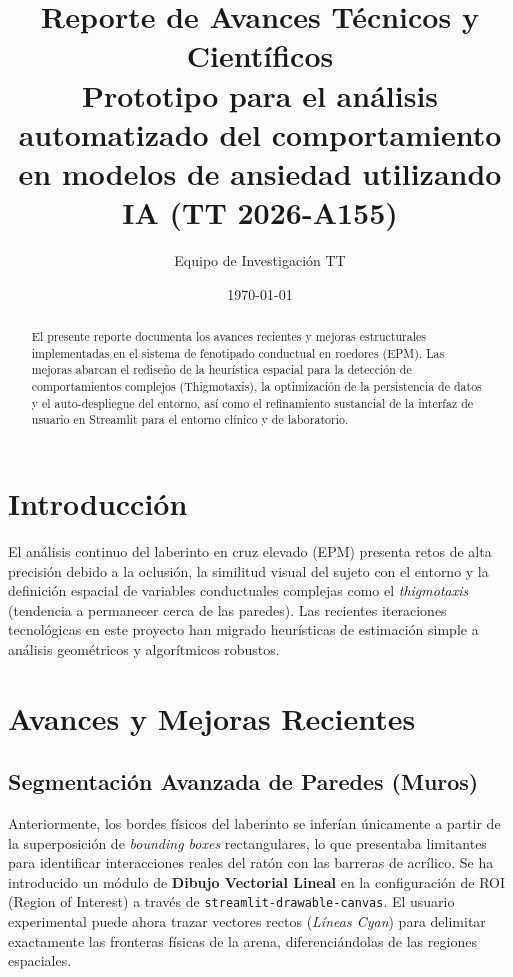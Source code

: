 \documentclass[12pt,a4paper]{article}
\title{\textbf{Reporte de Avances Técnicos y Científicos}\\ \large Prototipo para el análisis automatizado del comportamiento en modelos de ansiedad utilizando IA (TT 2026-A155)}
\author{Equipo de Investigación TT}
\date{\today}
\begin{document}
\maketitle

\begin{abstract}
El presente reporte documenta los avances recientes y mejoras estructurales implementadas en el sistema de fenotipado conductual en roedores (EPM). Las mejoras abarcan el rediseño de la heurística espacial para la detección de comportamientos complejos (Thigmotaxis), la optimización de la persistencia de datos y el auto-despliegue del entorno, así como el refinamiento sustancial de la interfaz de usuario en Streamlit para el entorno clínico y de laboratorio.
\end{abstract}

\section{Introducción}
El análisis continuo del laberinto en cruz elevado (EPM) presenta retos de alta precisión debido a la oclusión, la similitud visual del sujeto con el entorno y la definición espacial de variables conductuales complejas como el \textit{thigmotaxis} (tendencia a permanecer cerca de las paredes). Las recientes iteraciones tecnológicas en este proyecto han migrado heurísticas de estimación simple a análisis geométricos y algorítmicos robustos.

\section{Avances y Mejoras Recientes}

\subsection{Segmentación Avanzada de Paredes (Muros)}
Anteriormente, los bordes físicos del laberinto se inferían únicamente a partir de la superposición de \textit{bounding boxes} rectangulares, lo que presentaba limitantes para identificar interacciones reales del ratón con las barreras de acrílico. Se ha introducido un módulo de \textbf{Dibujo Vectorial Lineal} en la configuración de ROI (Region of Interest) a través de \texttt{streamlit-drawable-canvas}. El usuario experimental puede ahora trazar vectores rectos (\textit{Líneas Cyan}) para delimitar exactamente las fronteras físicas de la arena, diferenciándolas de las regiones espaciales.
\end{document}
